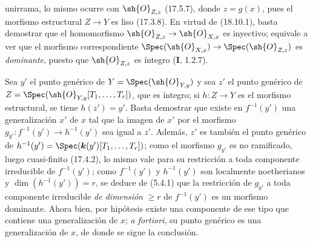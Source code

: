 
unirrama, lo mismo ocurre con $\sh{O}_{Z,z}$ (17.5.7), donde $z=g(x)$, pues el morfismo estructural $Z\to Y$ es liso (17.3.8). En virtud de (18.10.1), basta demostrar que el homomorfismo $\sh{O}_{Z,z}\to\sh{O}_{X,x}$ es inyectivo; equivale a ver que el morfismo correspondiente $\Spec(\sh{O}_{X,x})\to\Spec(\sh{O}_{Z,z})$ es \emph{dominante}, puesto que $\sh{O}_{Z,z}$ es íntegro (\textbf I, 1.2.7).

Sea $y'$ el punto genérico de $Y=\Spec(\sh{O}_{Y,y})$ y sea $z'$ el punto genérico de $Z=\Spec(\sh{O}_{Y,y}[T_1,\ldots,T_r])$, que es íntegro; si $h:Z\to Y$ es el morfismo estructural, se tiene $h(z')=y'$. Basta demostrar que existe en $f^{-1}(y')$ una generalización $x'$ de $x$ tal que la imagen de $x'$ por el morfismo $g_{y'}:f^{-1}(y')\to h^{-1}(y')$ sea igual a $z'$. Además, $z'$ es también el punto genérico de $h^{-1}(y')=\Spec(\boldsymbol k(y')[T_1,\ldots,T_r])$; como el morfismo $g_{y'}$ es no ramificado, luego cuasi-finito (17.4.2), lo mismo vale para su restricción a toda componente irreducible de $f^{-1}(y')$; como $f^{-1}(y')$ y $h^{-1}(y')$ son localmente noetherianos y $\dim(h^{-1}(y'))=r$, se deduce de (5.4.1) que la restricción de $g_{y'}$ a toda componente irreducible \emph{de dimensión} $\geq r$ de $f^{-1}(y')$ es un morfismo dominante. Ahora bien, por hipótesis existe una componente de ese tipo que contiene una generalización de $x$; \emph{a fortiori}, su punto genérico es una generalización de $x$, de donde se sigue la conclusión.
